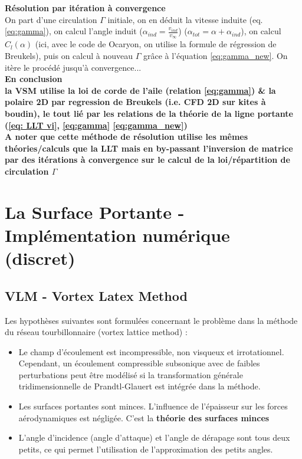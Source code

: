 \textbf{Résolution par itération à convergence}\\
On part d'une circulation $\Gamma$ initiale, on en déduit la vitesse induite (eq. \ref{eq:gamma}), on calcul l'angle induit ($\alpha_{ind} = \frac{v_{ind}}{v_{\infty}}$) ($\alpha_{tot} = \alpha + \alpha_{ind}$), on calcul $C_l(\alpha)$ (ici, avec le code de Ocaryon, on utilise la formule de régression de Breukels), puis on calcul à nouveau $\Gamma$ grâce à l'équation \ref{eq:gamma_new}. On itère le procédé jusqu'à convergence...\\

\textbf{En conclusion}\\
\textbf{la VSM utilise la loi de corde de l'aile (relation \ref{eq:gamma}) \& la polaire 2D par regression de Breukels (i.e. CFD 2D sur kites à boudin), le tout lié par les relations de la théorie de la ligne portante (\ref{eq: LLT vi}, \ref{eq:gamma} \ref{eq:gamma_new})}\\

\textbf{A noter que cette méthode de résolution utilise les mêmes théories/calculs que la LLT mais en by-passant l'inversion de matrice par des itérations à convergence sur le calcul de la loi/répartition de circulation $\Gamma$}\\

\section{La Surface Portante - Implémentation numérique (discret)} 
\label{sec:Ch1.3}

\subsection{VLM - Vortex Latex Method} 
\label{subsec:Ch1.3.1}

Les hypothèses suivantes sont formulées concernant le problème dans la méthode du réseau tourbillonnaire (vortex lattice method) :\\
\begin{itemize}
    \item Le champ d'écoulement est incompressible, non visqueux et irrotationnel. Cependant, un écoulement compressible subsonique avec de faibles perturbations peut être modélisé si la transformation générale tridimensionnelle de Prandtl-Glauert est intégrée dans la méthode.
    \item Les surfaces portantes sont minces. L'influence de l'épaisseur sur les forces aérodynamiques est négligée. C'est la \textbf{théorie des surfaces minces}
    \item L'angle d'incidence (angle d'attaque) et l'angle de dérapage sont tous deux petits, ce qui permet l'utilisation de l'approximation des petits angles.
\end{itemize}

